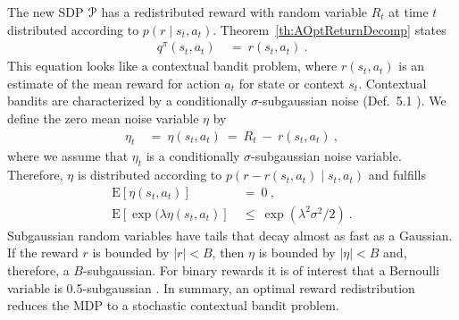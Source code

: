 \documentclass{article}
\newcommand\EXP{\mathbf{\mathrm{E}}}
\renewcommand{\leq}{\leqslant}
\begin{document}
\begin{appendices}
The new SDP $\mathcal{P}$ has a redistributed reward
with random variable $R_t$ at time $t$ distributed according to $p(r \mid s_t,a_t)$.
Theorem~\ref{th:AOptReturnDecomp} states
\begin{align}
   q^\pi(s_t,a_t) \ &= \   r(s_t,a_t)  \ .
\end{align} 
This equation looks like a contextual bandit problem, where
$r(s_t,a_t)$ is an estimate of the mean reward for action $a_t$
for state or context $s_t$.
Contextual bandits \cite[p. 208]{Lattimore:18} are characterized by 
a conditionally $\sigma$-subgaussian noise (Def.~5.1 \cite[p. 68]{Lattimore:18}).
We define the zero mean noise variable $\eta$ by
\begin{align}
  \eta_t \ &= \ \eta(s_t,a_t) \ = \  R_t \ - \ r(s_t,a_t)  \ , 
\end{align} 
where we assume that $\eta_t$ is a conditionally $\sigma$-subgaussian noise variable. 
Therefore, $\eta$ is distributed 
according to $p(r - r(s_t,a_t) \mid s_t,a_t)$ and fulfills
\begin{align}
  \EXP\left[ \eta(s_t,a_t) \right] \ &= \  0 \ , \\
  \EXP\left[ \exp(\lambda \eta(s_t,a_t) \right] \ &\leq \  \exp(\lambda^2 \sigma^2 /2) \ .
\end{align} 
Subgaussian random variables have tails that decay almost as fast as a Gaussian.
If the reward $r$ is bounded by $|r|<B$, then $\eta$ is bounded by $|\eta|<B$ 
and, therefore, a $B$-subgaussian. 
For binary rewards it is of interest that 
a Bernoulli variable is 0.5-subgaussian \cite[p. 71]{Lattimore:18}.
In summary, an optimal reward redistribution reduces the MDP 
to a stochastic contextual bandit problem.







\end{appendices}
\end{document}
